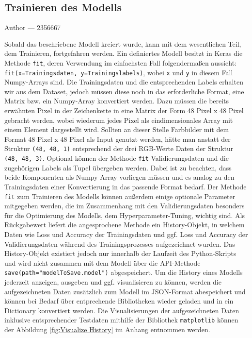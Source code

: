 \documentclass[12pt, a4paper]{report}
\makeatletter
\newcommand{\sectionauthor}[1]{%
  {\parindent0pt\vspace*{-5pt}%
  \large{Author --- }
  \linespread{1.1}\large\scshape#1%
  \par\nobreak\vspace*{35pt} }
  \@afterheading%
}
\makeatother
\begin{document}
\subsection{Trainieren des Modells}
\sectionauthor{2356667}
Sobald das beschriebene Modell kreiert wurde, kann mit dem wesentlichen Teil, dem Trainieren, fortgefahren werden. Ein definiertes Modell besitzt in Keras die Methode \texttt{fit}, deren Verwendung im einfachsten Fall folgendermaßen aussieht: \texttt{fit(x=Trainingsdaten, y=Trainingslabels)}, wobei \texttt{x} und \texttt{y} in diesem Fall Numpy-Arrays sind. Die Trainingsdaten und die entsprechenden Labels erhalten wir aus dem Dataset, jedoch müssen diese noch in das erforderliche Format, eine Matrix bzw. ein Numpy-Array konvertiert werden. Dazu müssen die bereits erwähnten Pixel in der Zeichenkette in eine Matrix der Form 48 Pixel x 48 Pixel gebracht werden, wobei wiederum jedes Pixel als eindimensionales Array mit einem Element dargestellt wird. Sollten an dieser Stelle Farbbilder mit dem Format 48 Pixel x 48 Pixel als Input genutzt werden, hätte man anstatt der Struktur \texttt{(48, 48, 1)} entsprechend der drei RGB-Werte Daten der Struktur \texttt{(48, 48, 3)}. Optional können der Methode \texttt{fit} Validierungsdaten und die zugehörigen Labels als Tupel übergeben werden. Dabei ist zu beachten, dass beide Komponenten als Numpy-Array vorliegen müssen und es analog zu den Trainingsdaten einer Konvertierung in das passende Format bedarf. Der Methode \texttt{fit} zum Trainieren des Modells können außerdem einige optionale Parameter mitgegeben werden, die im Zusammenhang mit den Validierungsdaten besonders für die Optimierung des Modells, dem Hyperparameter-Tuning, wichtig sind.\newline
Als Rückgabewert liefert die angesprochene Methode ein History-Objekt, in welchem Daten wie Loss und Accuracy der Trainingsdaten und ggf. Loss und Accuracy der Validierungsdaten während des Trainingsprozesses aufgezeichnet wurden. Das History-Objekt existiert jedoch nur innerhalb der Laufzeit des Python-Skripts und wird nicht zusammen mit dem Modell über die API-Methode \texttt{save(path="modelToSave.model")} abgespeichert. Um die History eines Modells jederzeit anzeigen, ausgeben und ggf. visualisieren zu können, werden die aufgezeichneten Daten zusätzlich zum Modell im JSON-Format abespeichert und können bei Bedarf über entprechende Bibliotheken wieder geladen und in ein Dictionary konvertiert werden.\newline
Die Visualisierungen der aufgezeichneten Daten inklusive entsprechender Testdaten mithilfe der Bibliothek \texttt{matplotlib} können der Abbildung \ref{fig:Visualize History} im Anhang entnommen werden.
\end{document}
